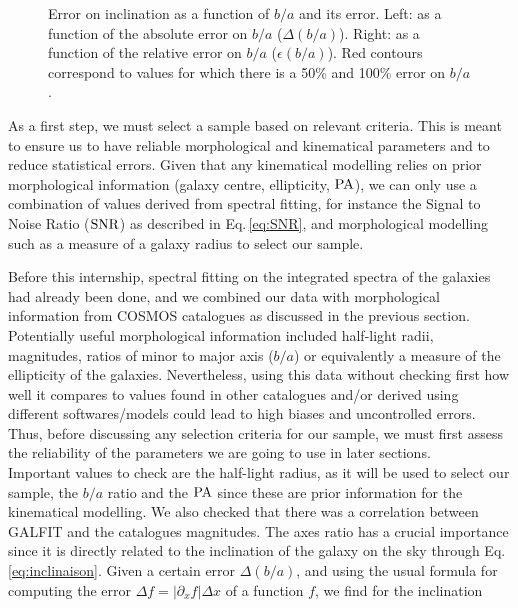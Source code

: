 \begin{figure}[H]
\begin{minipage}[c]{0.49\linewidth}
	\end{minipage}
	\caption[Error on inclination as a function of $b/a$ and its error.]{Error on inclination as a function of $b/a$ and its error. Left: as a function of the absolute error on $b/a$ ($\Delta (b/a)$). Right: as a function of the relative error on $b/a$ ($\epsilon ( b/a)$). Red contours correspond to values for which there is a 50\% and 100\% error on $b/a$.}
	\label{fig:erreur_inclinaison}
\end{figure}

As a first step, we must select a sample based on relevant criteria. This is meant to ensure us to have reliable morphological and kinematical parameters and to reduce statistical errors. Given that any kinematical modelling relies on prior morphological information (galaxy centre, ellipticity, $\rm{PA}$), we can only use a combination of values derived from spectral fitting, for instance the Signal to Noise Ratio ($\rm{SNR}$) as described in Eq.\,\ref{eq:SNR}, and morphological modelling such as a measure of a galaxy radius to select our sample.  

Before this internship, spectral fitting on the integrated spectra of the galaxies had already been done, and we combined our data with morphological information from COSMOS catalogues as discussed in the previous section. Potentially useful morphological information included half-light radii, magnitudes, ratios of minor to major axis ($b/a$) or equivalently a measure of the ellipticity of the galaxies. Nevertheless, using this data without checking first how well it compares to values found in other catalogues and/or derived using different softwares/models could lead to high biases and uncontrolled errors. Thus, before discussing any selection criteria for our sample, we must first assess the reliability of the parameters we are going to use in later sections. \\

Important values to check are the half-light radius, as it will be used to select our sample, the $b/a$ ratio and the $\rm{PA}$ since these are prior information for the kinematical modelling. We also checked that there was a correlation between GALFIT and the catalogues magnitudes. The axes ratio has a crucial importance since it is directly related to the inclination of the galaxy on the sky through Eq.\,\ref{eq:inclinaison}. Given a certain error $\Delta (b/a)$, and using the usual formula for computing the error $\Delta f = | \partial_x f | \Delta x$ of a function $f$, we find for the inclination

